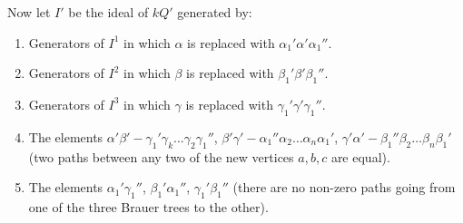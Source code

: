 \documentclass[12pt]{amsart}
\theoremstyle{plain}
\theoremstyle{remark}
\theoremstyle{definition}
\begin{document}
Now let $I'$ be the ideal of $kQ'$ generated by: 
\begin{enumerate}
    \item Generators of $I^1$ in which $\alpha$ is replaced with $\alpha_1' \alpha' \alpha_1''$.
    \item Generators of $I^2$ in which $\beta$ is replaced with $\beta_1' \beta' \beta_1''$.
    \item Generators of $I^3$ in which $\gamma$ is replaced with $\gamma_1' \gamma' \gamma_1''$. 
    \item The elements $\alpha'\beta' -  \gamma_1' \gamma_k \dots \gamma_2 \gamma_1''$, $\beta'\gamma' - \alpha_1''\alpha_2 \dots \alpha_n \alpha_1'$, $\gamma'\alpha' - \beta_1''\beta_2\dots \beta_n \beta_1'$ (two paths between any two of the new vertices $a,b,c$ are equal). 
    \item The elements $\alpha_1'\gamma_1''$, $\beta_1'\alpha_1''$, $\gamma_1'\beta_1''$ (there are no non-zero paths going from one of the three Brauer trees to the other).
\end{enumerate}
\end{document}
